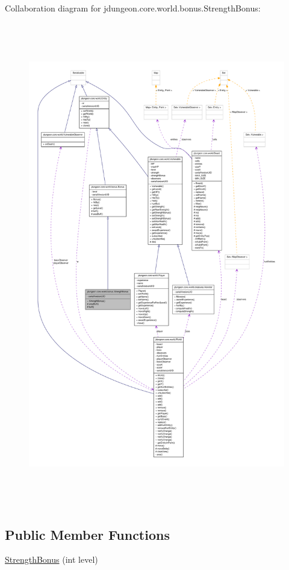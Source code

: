 Collaboration diagram for jdungeon.core.world.bonus.StrengthBonus:
\nopagebreak
\begin{figure}[H]
\begin{center}
\leavevmode
\includegraphics[height=600pt]{classjdungeon_1_1core_1_1world_1_1bonus_1_1_strength_bonus__coll__graph}
\end{center}
\end{figure}
\subsection*{Public Member Functions}
\begin{DoxyCompactItemize}
\item 
\hyperlink{classjdungeon_1_1core_1_1world_1_1bonus_1_1_strength_bonus_a6b9a3de197c0c9611bb3dae7ae57bc33}{StrengthBonus} (int level)
\end{DoxyCompactItemize}
